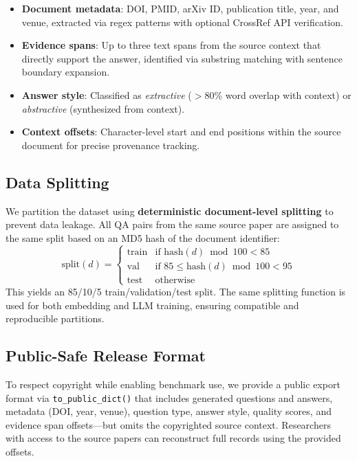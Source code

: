 \documentclass[11pt]{article}
\begin{document}
\begin{itemize}[leftmargin=*,itemsep=1pt]
    \item \textbf{Document metadata}: DOI, PMID, arXiv ID, publication title, year, and venue, extracted via regex patterns with optional CrossRef API verification.
    \item \textbf{Evidence spans}: Up to three text spans from the source context that directly support the answer, identified via substring matching with sentence boundary expansion.
    \item \textbf{Answer style}: Classified as \textit{extractive} ($>$80\% word overlap with context) or \textit{abstractive} (synthesized from context).
    \item \textbf{Context offsets}: Character-level start and end positions within the source document for precise provenance tracking.
\end{itemize}

\subsection{Data Splitting}
\label{sec:splitting}

We partition the dataset using \textbf{deterministic document-level splitting} to prevent data leakage. All QA pairs from the same source paper are assigned to the same split based on an MD5 hash of the document identifier:
\begin{equation}
    \text{split}(d) = \begin{cases}
        \text{train} & \text{if } \text{hash}(d) \bmod 100 < 85 \\
        \text{val}   & \text{if } 85 \leq \text{hash}(d) \bmod 100 < 95 \\
        \text{test}  & \text{otherwise}
    \end{cases}
\end{equation}
This yields an 85/10/5 train/validation/test split. The same splitting function is used for both embedding and LLM training, ensuring compatible and reproducible partitions.

\subsection{Public-Safe Release Format}

To respect copyright while enabling benchmark use, we provide a public export format via \texttt{to\_public\_dict()} that includes generated questions and answers, metadata (DOI, year, venue), question type, answer style, quality scores, and evidence span offsets---but omits the copyrighted source context. Researchers with access to the source papers can reconstruct full records using the provided offsets.
\end{document}
